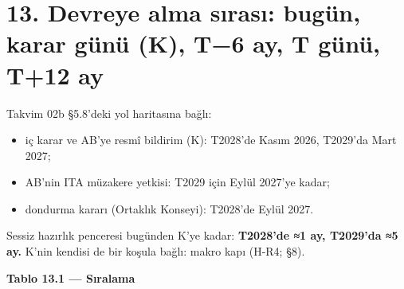 \hypertarget{02c_hazirlik-13-devreye-alma-sux131rasux131-buguxfcn-karar-guxfcnuxfc-k-t6-ay-t-guxfcnuxfc-t12-ay}{%
\section{13. Devreye alma sırası: bugün, karar günü (K), T−6 ay, T günü, T+12 ay}\label{02c_hazirlik-13-devreye-alma-sux131rasux131-buguxfcn-karar-guxfcnuxfc-k-t6-ay-t-guxfcnuxfc-t12-ay}}

Takvim 02b §5.8'deki yol haritasına bağlı:

\begin{itemize}
\tightlist
\item
  iç karar ve AB'ye resmî bildirim (K): T2028'de Kasım 2026, T2029'da Mart 2027;
\item
  AB'nin ITA müzakere yetkisi: T2029 için Eylül 2027'ye kadar;
\item
  dondurma kararı (Ortaklık Konseyi): T2028'de Eylül 2027.
\end{itemize}

Sessiz hazırlık penceresi bugünden K'ye kadar: \textbf{T2028'de ≈1 ay, T2029'da ≈5 ay.} K'nin kendisi de bir koşula bağlı: makro kapı (H-R4; §8).


\textbf{Tablo 13.1 --- Sıralama}

\nopagebreak[4]

\begingroup\gbtablo\footnotesize

